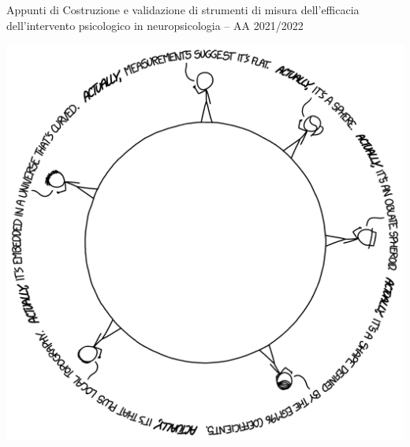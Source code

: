\cleardoublepage\newpage\thispagestyle{empty}\null
\thispagestyle{empty}
\begin{center}
\Large{Appunti di Costruzione e validazione di strumenti di misura dell'efficacia dell'intervento psicologico in neuropsicologia -- AA 2021/2022}

\vskip20pt

\includegraphics{images/actually_2x.png}
\end{center}

\setlength{\abovedisplayskip}{-5pt}
\setlength{\abovedisplayshortskip}{-5pt}
